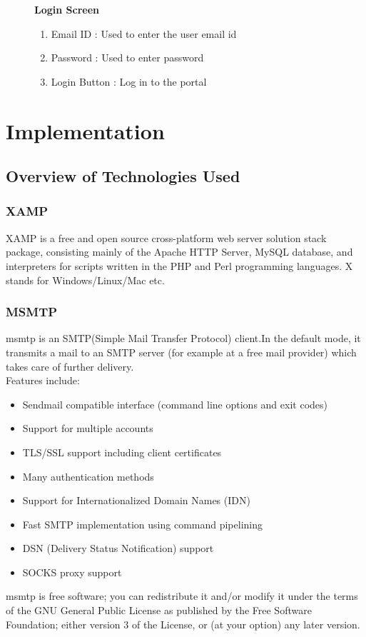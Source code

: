 \documentclass[11pt]{report}
\begin{document}
\begin{figure}[h]
\textbf{Login Screen}
\begin{enumerate}
\item{Email ID : Used to enter the user email id}
\item{Password : Used to enter password}
\item{Login Button : Log in to the portal}
\end{enumerate}
\end{figure}


\chapter{Implementation}

\section{Overview of Technologies Used}
\subsection{XAMP}
XAMP is a free and open source cross-platform web server solution stack package, consisting
mainly of the Apache HTTP Server, MySQL database, and interpreters for scripts written in the
PHP and Perl programming languages. X stands for Windows/Linux/Mac etc.

\subsection{MSMTP}
msmtp is an SMTP(Simple Mail Transfer Protocol) client.In the default mode, it transmits a mail to an SMTP server (for example at a free mail provider) which takes care of further delivery.\\Features include:
\begin{itemize}
  \item Sendmail compatible interface (command line options and exit codes)
  \item Support for multiple accounts
  \item TLS/SSL support including client certificates
  \item Many authentication methods
  \item Support for Internationalized Domain Names (IDN)
  \item Fast SMTP implementation using command pipelining
  \item DSN (Delivery Status Notification) support
  \item SOCKS proxy support
\end{itemize}
msmtp is free software; you can redistribute it and/or modify it under the terms of the GNU General Public License as published by the Free Software Foundation; either version 3 of the License, or (at your option) any later version.
\end{document}
